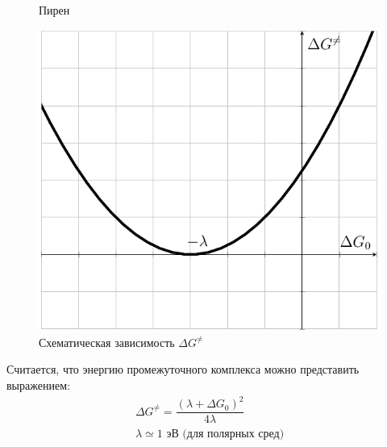 \begin{lecture}
\begin{lecSection}
\begin{figure}[H]
\begin{minipage}[h]{0.28\linewidth}
			\caption{Пирен}
		\end{minipage}
	\end{figure}

	\begin{figure}
		\centering\includegraphics[width=\linewidth]{lecture_03/G_scheme}
		\caption{Схематическая зависимость $ \Delta G^{\neq} $}
	\end{figure}

	Считается, что энергию промежуточного комплекса можно представить выражением:
	\begin{gather*}
		\Delta G^{\neq} = \dfrac{(\lambda + \Delta G_0)^2}{4\lambda} \\
		\lambda \simeq 1 \text{ эВ (для полярных сред)}
	\end{gather*}


\end{lecSection}
\end{lecture}
